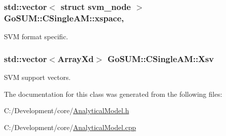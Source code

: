 \hypertarget{class_go_s_u_m_1_1_c_single_a_m_a1f9346a510fdb3908c9f7f5947a75410}{
\subsubsection[{xspace}]{\setlength{\rightskip}{0pt plus 5cm}std\-::vector$<$ struct svm\-\_\-node $>$ Go\-S\-U\-M\-::\-C\-Single\-A\-M\-::xspace\hspace{0.3cm}{\ttfamily [static]}, {\ttfamily [protected]}}}\label{class_go_s_u_m_1_1_c_single_a_m_a1f9346a510fdb3908c9f7f5947a75410}


S\-V\-M format specific. 

\hypertarget{class_go_s_u_m_1_1_c_single_a_m_ad000e314359f2cdfef4b671d93afedbe}{
\subsubsection[{Xsv}]{\setlength{\rightskip}{0pt plus 5cm}std\-::vector$<$Array\-Xd$>$ Go\-S\-U\-M\-::\-C\-Single\-A\-M\-::\-Xsv\hspace{0.3cm}{\ttfamily [protected]}}}\label{class_go_s_u_m_1_1_c_single_a_m_ad000e314359f2cdfef4b671d93afedbe}
S\-V\-M support vectors. 

The documentation for this class was generated from the following files\-:\begin{DoxyCompactItemize}
\item 
C\-:/\-Development/core/\hyperlink{_analytical_model_8h}{Analytical\-Model.\-h}\item 
C\-:/\-Development/core/\hyperlink{_analytical_model_8cpp}{Analytical\-Model.\-cpp}\end{DoxyCompactItemize}
